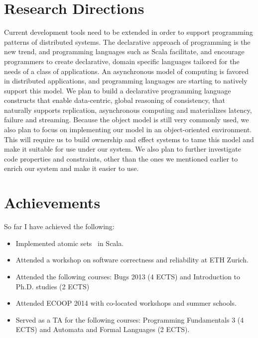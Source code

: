 \documentclass[]{usiinfprospectus}
\begin{document}
\section{Research Directions}

Current development tools need to be extended in order to support programming patterns of distributed systems. The declarative approach of programming is the new trend, and programming languages such as Scala facilitate, and encourage programmers to create declarative, domain specific languages tailored for the needs of a class of applications. An asynchronous model of computing is favored in distributed applications, and programming languages are starting to natively support this model. We plan to build a declarative programming language constructs that enable data-centric, global reasoning of consistency, that naturally supports replication, asynchronous computing and materializes latency, failure and streaming. Because the object model is still very commonly used, we also plan to focus on implementing our model in an object-oriented environment. This will require us to build ownership and effect systems to tame this model and make it suitable for use under our system. We also plan to further investigate code properties and constraints, other than the ones we mentioned earlier to enrich our system and make it easier to use. 

\section{Achievements}
So far I have achieved the following:
\begin{itemize}
	\item Implemented atomic sets~\cite{dolby2012data} in Scala.
	\item Attended a workshop on software correctness and reliability at ETH Zurich.
	\item Attended the following courses: Bugs 2013 (4 ECTS) and Introduction to Ph.D. studies (2 ECTS) 
	\item Attended ECOOP 2014 with co-located workshops and summer schools.
	\item Served as a TA for the following courses: Programming Fundamentals 3 (4 ECTS) and Automata and Formal Languages (2 ECTS). 
\end{itemize}

\end{document}
